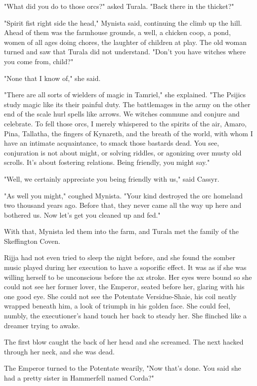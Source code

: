 "What did you do to those orcs?" asked Turala. "Back there in the thicket?"

"Spirit fist right side the head," Mynista said, continuing the climb up the hill. Ahead of them was the farmhouse grounds, a well, a chicken coop, a pond, women of all ages doing chores, the laughter of children at play. The old woman turned and saw that Turala did not understand. "Don't you have witches where you come from, child?"

"None that I know of," she said.

"There are all sorts of wielders of magic in Tamriel," she explained. "The Psijics study magic like its their painful duty. The battlemages in the army on the other end of the scale hurl spells like arrows. We witches commune and conjure and celebrate. To fell those orcs, I merely whispered to the spirits of the air, Amaro, Pina, Tallatha, the fingers of Kynareth, and the breath of the world, with whom I have an intimate acquaintance, to smack those bastards dead. You see, conjuration is not about might, or solving riddles, or agonizing over musty old scrolls. It's about fostering relations. Being friendly, you might say."

"Well, we certainly appreciate you being friendly with us," said Cassyr.

"As well you might," coughed Mynista. "Your kind destroyed the orc homeland two thousand years ago. Before that, they never came all the way up here and bothered us. Now let's get you cleaned up and fed."

With that, Mynista led them into the farm, and Turala met the family of the Skeffington Coven.

Rijja had not even tried to sleep the night before, and she found the somber music played during her execution to have a soporific effect. It was as if she was willing herself to be unconscious before the ax stroke. Her eyes were bound so she could not see her former lover, the Emperor, seated before her, glaring with his one good eye. She could not see the Potentate Versidue-Shaie, his coil neatly wrapped beneath him, a look of triumph in his golden face. She could feel, numbly, the executioner's hand touch her back to steady her. She flinched like a dreamer trying to awake.

The first blow caught the back of her head and she screamed. The next hacked through her neck, and she was dead.

The Emperor turned to the Potentate wearily, "Now that's done. You said she had a pretty sister in Hammerfell named Corda?"

